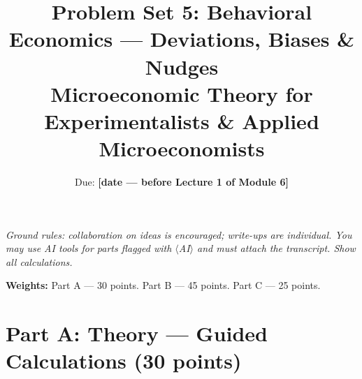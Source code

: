 \documentclass[11pt]{article}
\title{Problem Set 5: Behavioral Economics --- Deviations, Biases \& Nudges\\
\large Microeconomic Theory for Experimentalists \& Applied Microeconomists}
\author{Due: \textbf{[date --- before Lecture 1 of Module 6]}}
\date{}
\begin{document}
\maketitle

\noindent\emph{Ground rules: collaboration on ideas is encouraged; write-ups
are individual. You may use AI tools for parts flagged with
$\langle$AI$\rangle$ and must attach the transcript. Show all calculations.}

\medskip

\noindent\textbf{Weights:} Part A --- 30 points. Part B --- 45 points.
Part C --- 25 points.

\bigskip

\section*{Part A: Theory --- Guided Calculations (30 points)}
\end{document}
